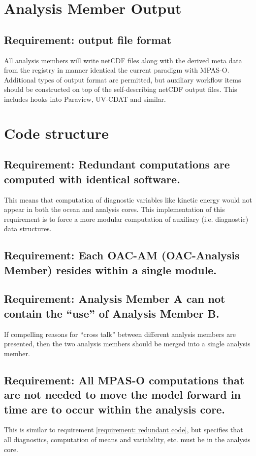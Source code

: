 \documentclass[11pt]{report}
\begin{document}
\newpage
\section{Analysis Member Output}
\subsection{{\color{red} Requirement:} output file format}
All analysis members will write netCDF files along with the derived meta data from the registry in manner identical the current paradigm with MPAS-O. Additional types of output format are permitted, but auxiliary workflow items should be constructed on top of the self-describing netCDF output files. This includes hooks into Paraview, UV-CDAT and similar.

\newpage
\section{Code structure}
\subsection{{\color{green} Requirement:} Redundant computations are computed with identical software.\label{requirement: redundant code}}
This means that computation of diagnostic variables like kinetic energy would not appear in both the ocean and analysis cores. This implementation of this requirement is to force a more modular computation of auxiliary (i.e. diagnostic) data structures.

\subsection{{\color{red} Requirement:} Each OAC-AM (OAC-Analysis Member) resides within a single module.}

\subsection{{\color{red} Requirement:} Analysis Member A can not contain the ``use'' of Analysis Member B.}
If compelling reasons for ``cross talk'' between different analysis members are presented, then the two analysis members should be merged into a single analysis member.

\subsection{{\color{red} Requirement:} All MPAS-O computations that are not needed to move the model forward in time are to occur within the analysis core.}
This is similar to requirement \ref{requirement: redundant code}, but specifies that all diagnostics, computation of means and variability, etc. must be in the analysis core.  
\end{document}
